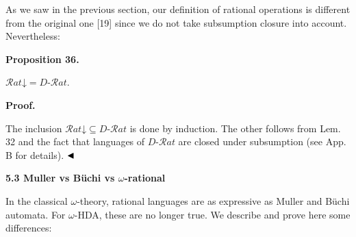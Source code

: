 \documentclass[10pt,a4paper]{article}
\begin{document}
 
  
 
 
 
As we saw in the previous section, our definition of rational operations is different from the original one [19] since we do not take subsumption closure into account. Nevertheless:\par
 
 
 
\par\medskip\noindent\textbf{Proposition 36.}\par
 
 
$\mathcal{R}at\mathord{\downarrow}=D\text{-}\mathcal{R}at$.\par
 
 
 

 
 
\par\medskip\noindent\textbf{Proof.}\par
 
 
The inclusion $\mathcal{R}at\mathord{\downarrow}\subseteq D\text{-}\mathcal{R}at$ is done by induction. The other follows from Lem. 32 and the fact that languages of $D\text{-}\mathcal{R}at$ are closed under subsumption (see App. B for details). $\hfill\blacktriangleleft$\par
 
 
 
 
 
\par\medskip\noindent\textbf{5.3 Muller vs Büchi vs $\omega$-rational}\par
 
 
In the classical $\omega$-theory, rational languages are as expressive as Muller and Büchi automata. For $\omega$-HDA, these are no longer true. We describe and prove here some differences:\par
 
\end{document}
